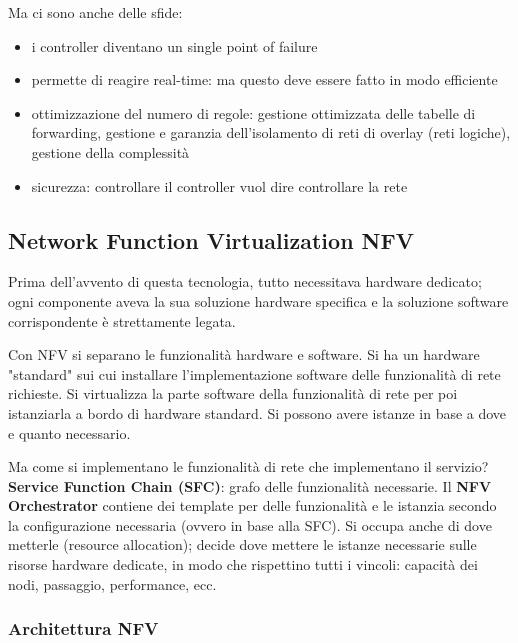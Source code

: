 Ma ci sono anche delle sfide: 
\begin{itemize}
	\item i controller diventano un single point of failure

	\item permette di reagire real-time: ma questo deve essere fatto in modo efficiente

	\item ottimizzazione del numero di regole: gestione ottimizzata delle tabelle di forwarding, gestione e garanzia dell'isolamento di reti di overlay (reti logiche), gestione della complessità

	\item sicurezza: controllare il controller vuol dire controllare la rete
\end{itemize}


\subsection{Network Function Virtualization NFV}

Prima dell'avvento di questa tecnologia, tutto necessitava hardware dedicato; ogni componente aveva la sua soluzione hardware specifica e la soluzione software corrispondente è strettamente legata.

Con NFV si separano le funzionalità hardware e software. Si ha un hardware "standard" sui cui installare l'implementazione software delle funzionalità di rete richieste. Si virtualizza la parte software della funzionalità di rete per poi istanziarla a bordo di hardware standard. Si possono avere istanze in base a dove e quanto necessario. 

Ma come si implementano le funzionalità di rete che implementano il servizio? \textbf{Service Function Chain (SFC)}: grafo delle funzionalità necessarie. 
Il \textbf{NFV Orchestrator} contiene dei template per delle funzionalità e le istanzia secondo la configurazione necessaria (ovvero in base alla SFC). Si occupa anche di dove metterle (resource allocation); decide dove mettere le istanze necessarie sulle risorse hardware dedicate, in modo che rispettino tutti i vincoli: capacità dei nodi, passaggio, performance, ecc.

\subsubsection{Architettura NFV}

